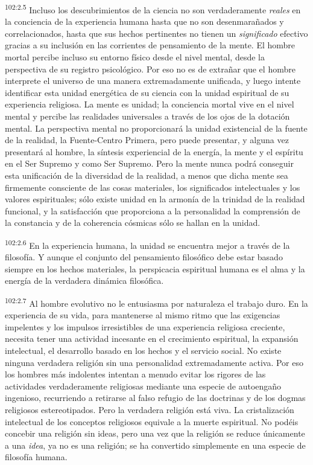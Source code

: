 \par
\textsuperscript{102:2.5} Incluso los descubrimientos de la ciencia no son verdaderamente \textit{reales} en la conciencia de la experiencia humana hasta que no son desenmarañados y correlacionados, hasta que sus hechos pertinentes no tienen un \textit{significado} efectivo gracias a su inclusión en las corrientes de pensamiento de la mente. El hombre mortal percibe incluso su entorno físico desde el nivel mental, desde la perspectiva de su registro psicológico. Por eso no es de extrañar que el hombre interprete el universo de una manera extremadamente unificada, y luego intente identificar esta unidad energética de su ciencia con la unidad espiritual de su experiencia religiosa. La mente es unidad; la conciencia mortal vive en el nivel mental y percibe las realidades universales a través de los ojos de la dotación mental. La perspectiva mental no proporcionará la unidad existencial de la fuente de la realidad, la Fuente-Centro Primera, pero puede presentar, y alguna vez presentará al hombre, la síntesis experiencial de la energía, la mente y el espíritu en el Ser Supremo y como Ser Supremo. Pero la mente nunca podrá conseguir esta unificación de la diversidad de la realidad, a menos que dicha mente sea firmemente consciente de las cosas materiales, los significados intelectuales y los valores espirituales; sólo existe unidad en la armonía de la trinidad de la realidad funcional, y la satisfacción que proporciona a la personalidad la comprensión de la constancia y de la coherencia cósmicas sólo se hallan en la unidad.

\par
\textsuperscript{102:2.6} En la experiencia humana, la unidad se encuentra mejor a través de la filosofía. Y aunque el conjunto del pensamiento filosófico debe estar basado siempre en los hechos materiales, la perspicacia espiritual humana es el alma y la energía de la verdadera dinámica filosófica.

\par
\textsuperscript{102:2.7} Al hombre evolutivo no le entusiasma por naturaleza el trabajo duro. En la experiencia de su vida, para mantenerse al mismo ritmo que las exigencias impelentes y los impulsos irresistibles de una experiencia religiosa creciente, necesita tener una actividad incesante en el crecimiento espiritual, la expansión intelectual, el desarrollo basado en los hechos y el servicio social. No existe ninguna verdadera religión sin una personalidad extremadamente activa. Por eso los hombres más indolentes intentan a menudo evitar los rigores de las actividades verdaderamente religiosas mediante una especie de autoengaño ingenioso, recurriendo a retirarse al falso refugio de las doctrinas y de los dogmas religiosos estereotipados. Pero la verdadera religión está viva. La cristalización intelectual de los conceptos religiosos equivale a la muerte espiritual. No podéis concebir una religión sin ideas, pero una vez que la religión se reduce únicamente a una \textit{idea}, ya no es una religión; se ha convertido simplemente en una especie de filosofía humana.

